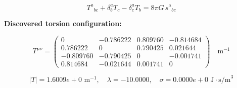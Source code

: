 
\begin{equation}
  T^a{}_{bc} + \delta^a_b T_c - \delta^a_c T_b = 8\pi G \, s^a{}_{bc}
\end{equation}

\textbf{Discovered torsion configuration:}

\begin{equation}
  T^{\mu\nu} = \begin{pmatrix}
    0 & -0.786222 & 0.809760 & -0.814684 \\
    0.786222 & 0 & 0.790425 & 0.021644 \\
    -0.809760 & -0.790425 & 0 & -0.001741 \\
    0.814684 & -0.021644 & 0.001741 & 0
  \end{pmatrix} \quad \text{m}^{-1}
\end{equation}

\begin{equation}
  |T| = 1.6009e+0 \text{ m}^{-1}, \quad
  \lambda = -10.0000, \quad
  \sigma = 0.0000e+0 \text{ J}\cdot\text{s/m}^3
\end{equation}